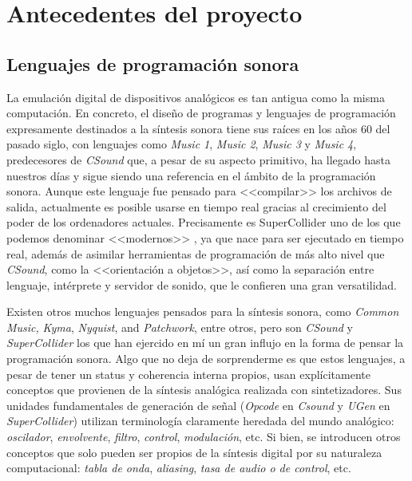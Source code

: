 \chapter[Antecedentes del proyecto]{Antecedentes del proyecto}
\label{ch:antecedentes}

\section{Lenguajes de programación sonora}

La emulación digital de dispositivos analógicos es tan antigua como la misma computación. En concreto, el diseño de programas y lenguajes de programación expresamente destinados a la síntesis sonora tiene sus raíces  en los años 60 del pasado siglo, con lenguajes como \textit{Music 1}, \textit{Music 2}, \textit{Music 3} y \textit{Music 4}, predecesores de \textit{CSound} \cite[~p. xxvii]{Csound_book} que, a pesar de su aspecto primitivo, ha llegado hasta nuestros días y sigue siendo una referencia en el ámbito de la programación sonora. Aunque este lenguaje fue pensado para <<compilar>> los archivos de salida, actualmente es posible usarse en tiempo real gracias al crecimiento del poder de los ordenadores actuales. Precisamente es SuperCollider uno de los que podemos denominar <<modernos>> \cite[~p. ix]{SC_book}, ya que nace para ser ejecutado en tiempo real, además de asimilar herramientas de programación de más alto nivel que \textit{CSound}, como la <<orientación a objetos>>, así como la separación entre lenguaje, intérprete y servidor de sonido, que le confieren una gran versatilidad. 




Existen otros muchos lenguajes pensados para la síntesis sonora, como \textit{Common Music,} \textit{Kyma}, \textit{Nyquist}, and \textit{Patchwork}, entre otros, pero son \textit{CSound} y \textit{SuperCollider} los que han ejercido en mí un gran influjo en la forma de pensar la programación sonora. Algo que no deja de sorprenderme es que estos lenguajes, a pesar de tener un status y coherencia interna propios, usan explícitamente conceptos que provienen de la síntesis analógica realizada con sintetizadores. Sus unidades fundamentales de generación de señal (\textit{Opcode} en \textit{Csound} y \textit{UGen} en \textit{SuperCollider}) utilizan terminología claramente heredada del mundo analógico: \textit{oscilador}, \textit{envolvente}, \textit{filtro}, \textit{control}, \textit{modulación}, etc. Si bien, se introducen otros conceptos que solo pueden ser propios de la síntesis digital por su naturaleza computacional: \textit{tabla de onda}, \textit{aliasing}, \textit{tasa de audio o de control}, etc.

